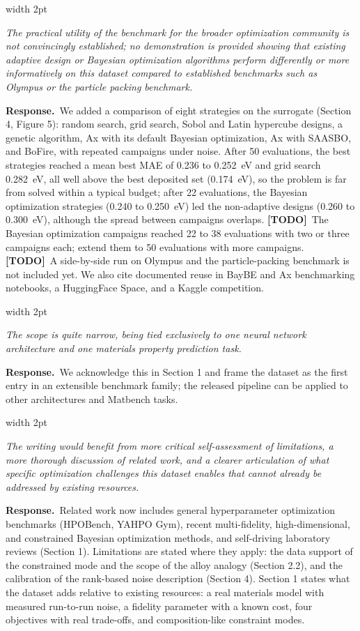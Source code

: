 \documentclass[11pt]{article}
\newenvironment{comment}
  {\par\medskip\noindent
   \begingroup\color{revrule}\leaders\vrule width 2pt\hfill\kern0pt\par\nobreak
   \endgroup
   \begin{list}{}{\setlength{\leftmargin}{1.5em}\setlength{\rightmargin}{0.5em}}%
   \item\itshape\ignorespaces}
  {\end{list}\par}
\newcommand{\response}{\par\noindent\textbf{\color{respblue}Response.}\ }
\newcommand{\todo}{\textbf{\color{red}[TODO]}\ }
\begin{document}
\begin{comment}
The practical utility of the benchmark for the broader optimization community is not convincingly established; no demonstration is provided showing that existing adaptive design or Bayesian optimization algorithms perform differently or more informatively on this dataset compared to established benchmarks such as Olympus or the particle packing benchmark.
\end{comment}
\response We added a comparison of eight strategies on the surrogate (Section 4, Figure 5): random search, grid search, Sobol and Latin hypercube designs, a genetic algorithm, Ax with its default Bayesian optimization, Ax with SAASBO, and BoFire, with repeated campaigns under noise. After 50 evaluations, the best strategies reached a mean best MAE of 0.236 to 0.252~eV and grid search 0.282~eV, all well above the best deposited set (0.174~eV), so the problem is far from solved within a typical budget; after 22 evaluations, the Bayesian optimization strategies (0.240 to 0.250~eV) led the non-adaptive designs (0.260 to 0.300~eV), although the spread between campaigns overlaps. \todo The Bayesian optimization campaigns reached 22 to 38 evaluations with two or three campaigns each; extend them to 50 evaluations with more campaigns. \todo A side-by-side run on Olympus and the particle-packing benchmark is not included yet. We also cite documented reuse in BayBE and Ax benchmarking notebooks, a HuggingFace Space, and a Kaggle competition.

\begin{comment}
The scope is quite narrow, being tied exclusively to one neural network architecture and one materials property prediction task.
\end{comment}
\response We acknowledge this in Section 1 and frame the dataset as the first entry in an extensible benchmark family; the released pipeline can be applied to other architectures and Matbench tasks.

\begin{comment}
The writing would benefit from more critical self-assessment of limitations, a more thorough discussion of related work, and a clearer articulation of what specific optimization challenges this dataset enables that cannot already be addressed by existing resources.
\end{comment}
\response Related work now includes general hyperparameter optimization benchmarks (HPOBench, YAHPO Gym), recent multi-fidelity, high-dimensional, and constrained Bayesian optimization methods, and self-driving laboratory reviews (Section 1). Limitations are stated where they apply: the data support of the constrained mode and the scope of the alloy analogy (Section 2.2), and the calibration of the rank-based noise description (Section 4). Section 1 states what the dataset adds relative to existing resources: a real materials model with measured run-to-run noise, a fidelity parameter with a known cost, four objectives with real trade-offs, and composition-like constraint modes.
\end{document}
